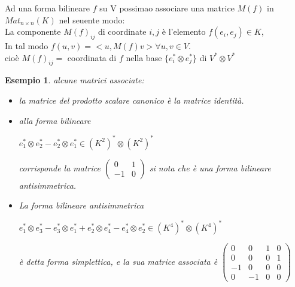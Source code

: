 \documentclass[a4paper,12pt]{article}
\theoremstyle{def}
\theoremstyle{prop}
\theoremstyle{esempio}
\newtheorem*{example}{Esempio}
\theoremstyle{dimostrazione}
\theoremstyle{teo}
\theoremstyle{osservazione}
\begin{document}
Ad una forma bilineare \(f\) su V possimao associare una matrice \(M(f)\) in \(Mat_{n \times n}(K)\) nel seuente modo:\\
La componente \(M(f)_{ij}\) di coordinate \(i, j\) è l'elemento \(f(e_i, e_j) \in K\),\\
In tal modo \(f(u, v) = <u, M(f)v> \forall u, v \in V\).\\
cioè \(M(f)_{ij} =\) coordinata di \(f\) nella base \(\{e_i^* \otimes e_j^*\}\) di \(V^* \otimes V^*\)
\newpage
\begin{example}
	alcune matrici associate:
	\begin{itemize}
		\item la matrice del prodotto scalare canonico è la matrice identità.
		\item alla forma bilineare
		      \begin{center}
			      \(e_1^* \otimes e_2^* - e_2^* \otimes e_1^* \in (K^2)^* \otimes (K^2)^*\)
		      \end{center}
		      corrisponde la matrice
		      \(\begin{pmatrix}
			      0  & 1 \\
			      -1 & 0
		      \end{pmatrix}\) si nota che è una forma bilineare antisimmetrica.
		\item La forma bilineare antisimmetrica
		      \begin{center}
			      \(e_1^* \otimes e_3^* - e_3^* \otimes e_1^* + e_2^* \otimes e_4^* - e_4^* \otimes e_2^* \in (K^4)^* \otimes (K^4)^*\)
		      \end{center}
		      è detta forma simplettica, e la sua matrice associata è
		      \(\begin{pmatrix}
			      0  & 0  & 1 & 0 \\
			      0  & 0  & 0 & 1 \\
			      -1 & 0  & 0 & 0 \\
			      0  & -1 & 0 & 0
		      \end{pmatrix}\)
	\end{itemize}
\end{example}
\end{document}
